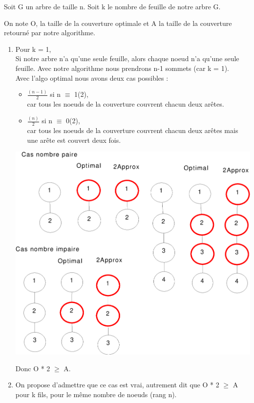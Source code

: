 Soit G un arbre de taille n. Soit k le nombre de feuille de notre
arbre G.

On note O, la taille de la couverture optimale et A la taille de la couverture retourn\'e par notre algorithme.

\bigskip
\begin{enumerate}
 \item Pour k = 1,\\


Si notre arbre n'a qu'une seule feuille, alors chaque noeud n'a qu'une
seule feuille. Avec notre algorithme nous prendrons n-1 sommets (car k
= 1).\\
Avec l'algo optimal nous avons deux cas possibles :
\begin{itemize}
      	\item $\frac{(n - 1)}{2}$ si n $\equiv$ 1(2),\\
		 car tous les noeuds de la couverture couvrent chacun deux ar\^etes.\\
	\item $\frac{(n)}{2}$ si n $\equiv$ 0(2),\\
		car tous les noeuds de la couverture couvrent chacun deux ar\^etes mais une ar\^ete est couvert deux fois.
\end{itemize}

\bigskip
\includegraphics[width=15cm]{demo1}

Donc O  * 2 $\geq$ A.

\item On propose d'admettre que ce cas est vrai, autrement dit que O  * 2 $\geq$ A pour k fils, pour le m\^eme nombre de noeuds (rang n). 


\end{enumerate}
